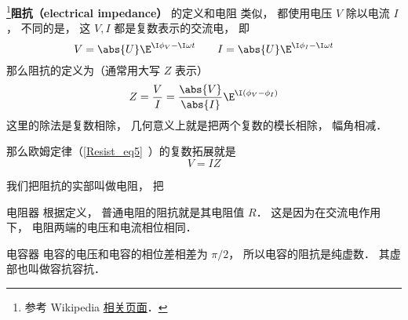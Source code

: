 
\begin{issues}
\issueDraft
\end{issues}


\footnote{参考 Wikipedia \href{https://en.wikipedia.org/wiki/Electrical_impedance}{相关页面}．}\textbf{阻抗（electrical impedance）} 的定义和电阻 类似， 都使用电压 $V$ 除以电流 $I$， 不同的是， 这 $V, I$ 都是复数表示的交流电， 即
\begin{equation}
V = \abs{U} \E^{\I \phi_V - \I \omega t}
\qquad
I = \abs{U} \E^{\I \phi_I - \I \omega t}
\end{equation}
那么阻抗的定义为（通常用大写 $Z$ 表示）
\begin{equation}
Z = \frac{V}{I} = \frac{\abs{V}}{\abs{I}} \E^{\I (\phi_V - \phi_I)}
\end{equation}
这里的除法是复数相除， 几何意义上就是把两个复数的模长相除， 幅角相减．

那么欧姆定律（\autoref{Resist_eq5}~）的复数拓展就是
\begin{equation}
V = IZ
\end{equation}

我们把阻抗的实部叫做电阻， 把

\begin{example}{电阻器}
根据定义， 普通电阻的阻抗就是其电阻值 $R$． 这是因为在交流电作用下， 电阻两端的电压和电流相位相同．
\end{example}

\begin{example}{电容器}
电容的电压和电容的相位差相差为 $\pi/2$， 所以电容的阻抗是纯虚数． 其虚部也叫做容抗容抗．
\end{example}

